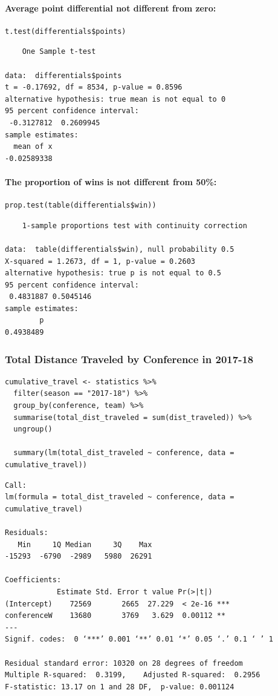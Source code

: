 \documentclass[
    12pt,
    a4paper,
    titlepage,  %
    abstract,  %
    headings=standardclasses,  %
    bibliography=totocnumbered  %
]{scrartcl}
\begin{document}
\paragraph{Average point differential not different from zero:}

\begin{verbatim}
t.test(differentials$points)
\end{verbatim}

\begin{Verbatim}
    One Sample t-test

data:  differentials$points
t = -0.17692, df = 8534, p-value = 0.8596
alternative hypothesis: true mean is not equal to 0
95 percent confidence interval:
 -0.3127812  0.2609945
sample estimates:
  mean of x 
-0.02589338
\end{Verbatim}
 
\paragraph{The proportion of wins is not different from 50\%:}

\begin{verbatim}
prop.test(table(differentials$win))
\end{verbatim}

\begin{Verbatim}
    1-sample proportions test with continuity correction

data:  table(differentials$win), null probability 0.5
X-squared = 1.2673, df = 1, p-value = 0.2603
alternative hypothesis: true p is not equal to 0.5
95 percent confidence interval:
 0.4831887 0.5045146
sample estimates:
        p 
0.4938489
\end{Verbatim}

\subsubsection{Total Distance Traveled by Conference in 2017-18} \label{travel-test}

\begin{verbatim}
cumulative_travel <- statistics %>%
  filter(season == "2017-18") %>%
  group_by(conference, team) %>%
  summarise(total_dist_traveled = sum(dist_traveled)) %>%
  ungroup()

  summary(lm(total_dist_traveled ~ conference, data = cumulative_travel))
\end{verbatim}

\begin{Verbatim}
Call:
lm(formula = total_dist_traveled ~ conference, data = cumulative_travel)

Residuals:
   Min     1Q Median     3Q    Max 
-15293  -6790  -2989   5980  26291 

Coefficients:
            Estimate Std. Error t value Pr(>|t|)    
(Intercept)    72569       2665  27.229  < 2e-16 ***
conferenceW    13680       3769   3.629  0.00112 ** 
---
Signif. codes:  0 ‘***’ 0.001 ‘**’ 0.01 ‘*’ 0.05 ‘.’ 0.1 ‘ ’ 1

Residual standard error: 10320 on 28 degrees of freedom
Multiple R-squared:  0.3199,	Adjusted R-squared:  0.2956 
F-statistic: 13.17 on 1 and 28 DF,  p-value: 0.001124
\end{Verbatim}
\end{document}
